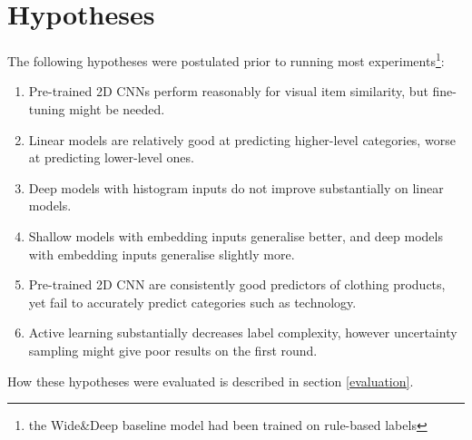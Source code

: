 \section{Hypotheses}

The following hypotheses were postulated prior to running most experiments\footnote{the Wide\&Deep baseline model had been trained on rule-based labels}:

\begin{enumerate}
  \item Pre-trained 2D CNNs perform reasonably for visual item similarity, but fine-tuning might be needed.
  \item Linear models are relatively good at predicting higher-level categories, worse at predicting lower-level ones.
  \item Deep models with histogram inputs do not improve substantially on linear models.
  \item Shallow models with embedding inputs generalise better, and deep models with embedding inputs generalise slightly more.
  \item Pre-trained 2D CNN are consistently good predictors  of clothing products, yet fail to accurately predict categories such as technology.

  \item Active learning substantially decreases label complexity, however uncertainty sampling might give poor results on the first round.
\end{enumerate}

\hfill \break
How these hypotheses were evaluated is described in section \ref{evaluation}.


